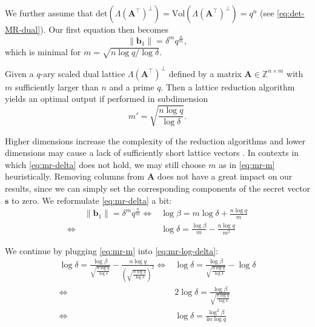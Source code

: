 We further assume that $\text{det}(\Lambda(\mathbf{A}^\intercal)^{\perp}) = \text{Vol}(\Lambda(\mathbf{A}^\intercal)^{\perp}) = q^n$ (see \cref{eq:det-MR-dual}). Our first equation then becomes
\begin{equation}\label{eq:mr-delta}
  \|\mathbf{b}_1\| = \delta^m q^{\frac{n}{m}},
\end{equation}
which is minimal for $m = \sqrt{n \log q / \log \delta}$.
\begin{theorem}
  Given a $q$-ary scaled dual lattice  $\Lambda(\mathbf{A}^\intercal)^{\perp}$ defined by a matrix $\mathbf{A} \in \mathbb{Z}^{n \times m}$ with $m$ sufficiently larger than $n$ and a prime $q$. Then a lattice reduction algorithm yields an optimal output if performed in subdimension
  \begin{equation}
    m' = \sqrt{\frac{n \log q}{\log \delta}}. \label{eq:mr-m}
  \end{equation}
\end{theorem}

Higher dimensions increase the complexity of the reduction algorithms and lower dimensions may cause a lack of sufficiently short lattice vectors \cite{MR09}. In contexts in which \cref{eq:mr-delta} does not hold, we may still choose $m$ as in \cref{eq:mr-m} heuristically. Removing columns from $\mathbf{A}$ does not have a great impact on our results, since we can simply set the corresponding components of the secret vector $\mathbf{s}$ to zero. We reformulate \cref{eq:mr-delta} a bit:
\begin{align}
  \qquad\|\mathbf{b}_1\| = \delta^m q^{\frac{n}{m}} \iff & \log \beta = m \log \delta + \frac{n \log q}{m}   \nonumber                       \\
  \iff                                                   & \log \delta = \frac{\log \beta}{m} - \frac{n \log q}{m^2} \label{eq:mr-log-delta}
\end{align}

We continue by plugging \cref{eq:mr-m} into \cref{eq:mr-log-delta}:
\begin{align}
  \log \delta = \frac{\log \beta}{\sqrt{\frac{n \log q}{\log \delta}}} - \frac{n \log q}{\left(\sqrt{\frac{n \log q}{\log \delta}}\right)^2} \iff & \log \delta = \frac{\log \beta}{\sqrt{\frac{n \log q}{\log \delta}}} - \log \delta \nonumber \\
  \iff                                                                                                                                            & 2\log \delta = \frac{\log \beta}{\sqrt{\frac{n \log q}{\log \delta}}}              \nonumber \\
  \iff                                                                                                                                            & \log \delta = \frac{\log^2 \beta}{4n \log q}
\end{align}

